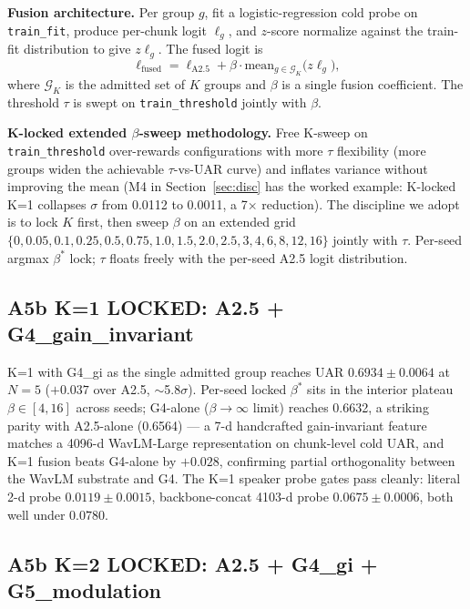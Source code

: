 \textbf{Fusion architecture.} Per group $g$, fit a logistic-regression cold probe on \texttt{train\_fit}, produce per-chunk logit $\ell_g$, and $z$-score normalize against the train-fit distribution to give $z\ell_g$. The fused logit is
\begin{equation}
\ell_{\text{fused}} = \ell_{\text{A2.5}} + \beta \cdot \mathrm{mean}_{g \in \mathcal{G}_K} \big(z\ell_g\big),
\label{eq:fusion}
\end{equation}
where $\mathcal{G}_K$ is the admitted set of $K$ groups and $\beta$ is a single fusion coefficient. The threshold $\tau$ is swept on \texttt{train\_threshold} jointly with $\beta$.

\textbf{K-locked extended $\beta$-sweep methodology.} Free K-sweep on \texttt{train\_threshold} over-rewards configurations with more $\tau$ flexibility (more groups widen the achievable $\tau$-vs-UAR curve) and inflates variance without improving the mean (M4 in Section~\ref{sec:disc} has the worked example: K-locked K=1 collapses $\sigma$ from 0.0112 to 0.0011, a 7$\times$ reduction). The discipline we adopt is to lock $K$ first, then sweep $\beta$ on an extended grid $\{0, 0.05, 0.1, 0.25, 0.5, 0.75, 1.0, 1.5, 2.0, 2.5, 3, 4, 6, 8, 12, 16\}$ jointly with $\tau$. Per-seed argmax $\beta^*$ lock; $\tau$ floats freely with the per-seed A2.5 logit distribution.

\subsection{A5b K=1 LOCKED: A2.5 + G4\_gain\_invariant}

K=1 with G4\_gi as the single admitted group reaches UAR $0.6934 \pm 0.0064$ at $N{=}5$ ($+0.037$ over A2.5, $\sim$5.8$\sigma$). Per-seed locked $\beta^*$ sits in the interior plateau $\beta \in [4, 16]$ across seeds; G4-alone ($\beta \to \infty$ limit) reaches 0.6632, a striking parity with A2.5-alone (0.6564) — a 7-d handcrafted gain-invariant feature matches a 4096-d WavLM-Large representation on chunk-level cold UAR, and K=1 fusion beats G4-alone by $+0.028$, confirming partial orthogonality between the WavLM substrate and G4. The K=1 speaker probe gates pass cleanly: literal 2-d probe $0.0119 \pm 0.0015$, backbone-concat 4103-d probe $0.0675 \pm 0.0006$, both well under $0.0780$.

\subsection{A5b K=2 LOCKED: A2.5 + G4\_gi + G5\_modulation}
\label{ssec:k2}

